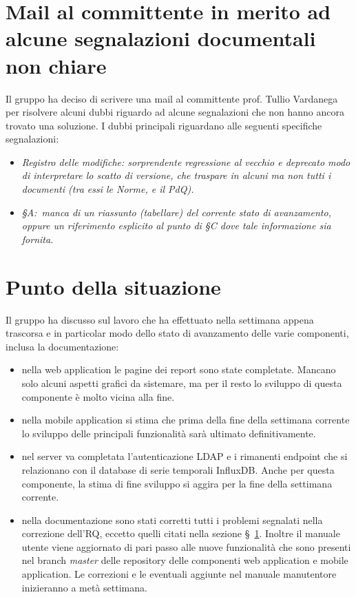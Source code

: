 \documentclass{article}
\begin{document}
\section{Mail al committente in merito ad alcune segnalazioni documentali non chiare}%
\label{sec:mail_al_committente_in_merito_ad_alcune_segnalazioni_documentali_non_chiare}
Il gruppo ha deciso di scrivere una mail al committente prof. Tullio Vardanega per risolvere alcuni dubbi riguardo ad alcune segnalazioni che non hanno ancora trovato una soluzione.
I dubbi principali riguardano alle seguenti specifiche segnalazioni:
\begin{itemize}
  \item \textit{Registro delle modifiche: sorprendente regressione al vecchio e deprecato modo di interpretare lo scatto di versione, che traspare in alcuni ma non tutti i documenti (tra essi le Norme, e il PdQ).}
  \item \textit{§A:~manca di un riassunto (tabellare) del corrente stato di avanzamento, oppure un riferimento esplicito al punto di §C dove tale informazione sia fornita.}
\end{itemize}

\section{Punto della situazione}%
\label{sec:punto_della_situazione}
Il gruppo ha discusso sul lavoro che ha effettuato nella settimana appena trascorsa e in particolar modo dello stato di avanzamento delle varie componenti, inclusa la documentazione:
\begin{itemize}
  \item nella web application le pagine dei report sono state completate. Mancano solo alcuni aspetti grafici da sistemare, ma per il resto lo sviluppo di questa componente è molto vicina alla fine.
  \item nella mobile application si stima che prima della fine della settimana corrente lo sviluppo delle principali funzionalità sarà ultimato definitivamente.
  \item nel server va completata l'autenticazione LDAP e i rimanenti endpoint che si relazionano con il database di serie temporali InfluxDB\@. Anche per questa componente, la stima di fine sviluppo si aggira per la fine della settimana corrente.
  \item nella documentazione sono stati corretti tutti i problemi segnalati nella correzione dell'RQ, eccetto quelli citati nella sezione §~\ref{sec:mail_al_committente_in_merito_ad_alcune_segnalazioni_documentali_non_chiare}. Inoltre il manuale utente viene aggiornato di pari passo alle nuove funzionalità che sono presenti nel branch \textit{master} delle repository delle componenti web application e mobile application. Le correzioni e le eventuali aggiunte nel manuale manutentore inizieranno a metà settimana.
\end{itemize}
\end{document}
